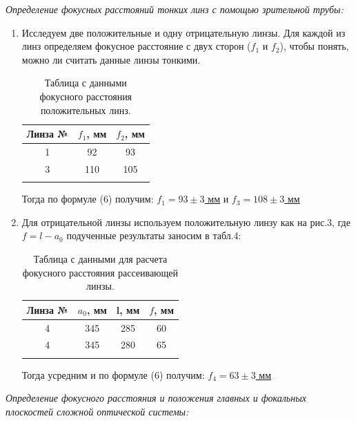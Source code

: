 \documentclass[a4paper, 12pt]{article}%
\newcommand{\RomanNumeralCaps}[1]{\uppercase\expandafter{\romannumeral#1}}
\begin{document}
\newpage
\RomanNumeralCaps 2 \textit{Определение фокусных расстояний тонких линз с помощью зрительной трубы:}\\

\begin{enumerate}


\item Исследуем две положительные и одну отрицательную линзы. Для каждой из линз определяем фокусное расстояние с двух сторон ($f_1$ и $f_2$), чтобы понять, можно ли считать данные линзы тонкими.

\begin{longtable}{|c|c|c|}
	\hline
	Линза №&$f_1$, мм & $f_2$, мм \\ \hline
	1 & 92 & 93  \\ \hline
	3 & 110 & 105  \\ \hline
	\caption{Таблица с данными фокусного расстояния положительных линз.}
\end{longtable}
Тогда по формуле (6) получим: \underline{$f_1 = 93 \pm 3$ мм}  и \underline{$f_3 = 108 \pm 3$ мм}\\

\item Для отрицательной линзы используем положительную линзу как на рис.3, где $f = l - a_0$ подученные результаты заносим в табл.4:

\begin{longtable}{|c|c|c|c|}
	\hline
	Линза №&$a_0$, мм & l, мм & $f$, мм  \\ \hline
	4 & 345 & 285 & 60 \\ \hline
	4 & 345 & 280 & 65  \\ \hline
	\caption{Таблица с данными для расчета фокусного расстояния рассеивающей линзы.}
\end{longtable}

Тогда усредним и по формуле (6) получим: \underline{$f_4 = 63 \pm 3$ мм} \\
\end{enumerate}

	\RomanNumeralCaps 3 \textit{Определение фокусного расстояния и положения главных и фокальных плоскостей сложной оптической системы:}\\
	
\end{document}
